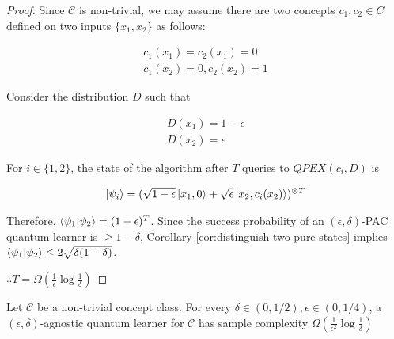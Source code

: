 \documentclass[main.tex]{subfiles}
\begin{document}
\begin{proof} 
Since $\mathcal{C}$ is non-trivial, we may assume there are two concepts $c_1,c_2 \in C$ defined on two inputs $\{x_1,x_2\}$ as follows:

\begin{align*}
 c_1(x_1) = c_2(x_1) = 0\\
 c_1(x_2) = 0,c_2(x_2) = 1
\end{align*}

Consider the distribution $D$ such that

\begin{align*}
D(x_1) = 1-\epsilon\\
D(x_2) = \epsilon
\end{align*}
 
For $i \in \{1,2\}$, the state of the algorithm after $T$ queries to $QPEX(c_i,D)$ is
 
\begin{align*}
 \ket{\psi_i} = (\sqrt{1-\epsilon}\ket{x_1, 0} + \sqrt{\epsilon}\ket{x_2, c_i(x_2)})^{\otimes T}
\end{align*}
 
 Therefore, $\bra{\psi_1}\ket{\psi_2} = (1-\epsilon)^T$. Since the success probability of an $(\epsilon, \delta)$-PAC quantum learner is $\geq 1 - \delta$, Corollary \ref{cor:distinguish-two-pure-states} implies $\bra{\psi_1}\ket{\psi_2} \leq 2\sqrt{\delta(1-\delta)}$. 
 
 $\therefore T = \Omega(\frac{1}{\epsilon}\log \frac{1}{\delta})$
\end{proof}

\begin{lemma}
\label{lem:vc-indep-agn}
Let $\mathcal{C}$ be a non-trivial concept class. For every $\delta \in (0,1/2), \epsilon \in (0,1/4)$, a $(\epsilon,\delta)$-agnostic quantum learner for $\mathcal{C}$ has sample complexity $\Omega(\frac{1}{\epsilon^2}\log \frac{1}{\delta})$
\end{lemma}
\end{document}
